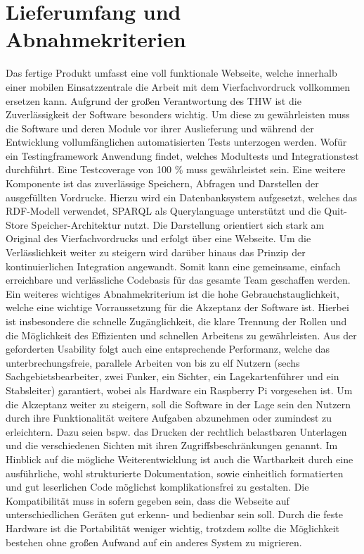 \section{Lieferumfang und Abnahmekriterien}
Das fertige Produkt umfasst eine voll funktionale Webseite, welche innerhalb einer mobilen Einsatzzentrale die Arbeit mit dem Vierfachvordruck vollkommen ersetzen kann. Aufgrund der großen Verantwortung des THW ist die Zuverlässigkeit der Software besonders wichtig. Um diese zu gewährleisten muss die Software und deren Module vor ihrer Auslieferung und während der Entwicklung vollumfänglichen automatisierten Tests unterzogen werden. Wofür ein Testingframework Anwendung findet, welches Modultests und Integrationstest durchführt. Eine Testcoverage von 100 \% muss gewährleistet sein. Eine weitere Komponente ist das zuverlässige Speichern, Abfragen und Darstellen der ausgefüllten Vordrucke. Hierzu wird ein Datenbanksystem aufgesetzt, welches das RDF-Modell verwendet, SPARQL als Querylanguage unterstützt und die Quit-Store Speicher-Architektur nutzt. Die Darstellung orientiert sich stark am Original des Vierfachvordrucks und erfolgt über eine Webseite. Um die Verlässlichkeit weiter zu steigern wird darüber hinaus das Prinzip der kontinuierlichen Integration angewandt. Somit kann eine gemeinsame, einfach erreichbare und verlässliche Codebasis für das gesamte Team geschaffen werden. Ein weiteres wichtiges Abnahmekriterium ist die hohe Gebrauchstauglichkeit, welche eine wichtige Vorraussetzung für die Akzeptanz der Software ist. Hierbei ist insbesondere die schnelle Zugänglichkeit, die klare Trennung der Rollen und die Möglichkeit des Effizienten und schnellen Arbeitens zu gewährleisten. Aus der geforderten Usability folgt auch eine entsprechende Performanz, welche das unterbrechungsfreie, parallele Arbeiten von bis zu elf Nutzern (sechs Sachgebietsbearbeiter, zwei Funker, ein Sichter, ein Lagekartenführer und ein Stabsleiter) garantiert, wobei als Hardware ein Raspberry Pi vorgesehen ist. Um die Akzeptanz weiter zu steigern, soll die Software in der Lage sein den Nutzern durch ihre Funktionalität weitere Aufgaben abzunehmen oder zumindest zu erleichtern. Dazu seien bspw. das Drucken der rechtlich belastbaren Unterlagen und die verschiedenen Sichten mit ihren Zugriffsbeschränkungen genannt. Im Hinblick auf die mögliche Weiterentwicklung ist auch die Wartbarkeit durch eine ausführliche, wohl strukturierte Dokumentation, sowie einheitlich formatierten und gut leserlichen Code möglichst komplikationsfrei zu gestalten. Die Kompatibilität muss in sofern gegeben sein, dass die Webseite auf unterschiedlichen Geräten gut erkenn- und bedienbar sein soll. Durch die feste Hardware ist die Portabilität weniger wichtig, trotzdem sollte die Möglichkeit bestehen ohne großen Aufwand auf ein anderes System zu migrieren. 